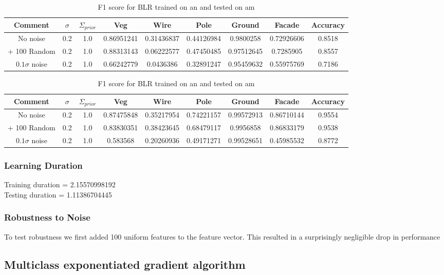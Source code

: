 \documentclass[10pt,a4paper]{article}
\begin{document}
\begin{table}[h]
\centering
\begin{tabular}{|c|c|c||c|c|c|c|c||c||}
\hline
Comment&$\sigma$&$\Sigma_{prior}$&Veg & Wire & Pole & Ground & Facade & Accuracy\\ \hline
No noise&0.2 & 1.0 & 0.86951241 & 0.31436837 & 0.44126984 & 0.9800258 &  0.72926606 & 0.8518\\ \hline
+ 100 Random & 0.2 & 1.0 & 0.88313143 & 0.06222577 & 0.47450485 & 0.97512645 & 0.7285905  & 0.8557\\ \hline
$0.1 \sigma$ noise & 0.2 & 1.0 & 0.66242779 & 0.0436386  & 0.32891247 & 0.95459632 & 0.55975769 & 0.7186 \\ \hline
\end{tabular}
\caption{F1 score for BLR trained on am and tested on an}
\vspace{10pt}
\begin{tabular}{||c|c|c||c|c|c|c|c||c||}
\hline
Comment&$\sigma$&$\Sigma_{prior}$&Veg & Wire & Pole & Ground & Facade & Accuracy\\ \hline
No noise & 0.2 & 1.0& 0.87475848 & 0.35217954  &0.74221157  &0.99572913  &0.86710144 & 0.9554\\ \hline
+ 100 Random & 0.2 & 1.0 & 0.83830351 & 0.38423645  &0.68479117  &0.9956858  &0.86833179 &0.9538 \\ \hline
$0.1 \sigma$ noise & 0.2 & 1.0 & 0.583568 & 0.20260936 & 0.49171271 & 0.99528651  &0.45985532 & 0.8772\\ \hline
\end{tabular}
\caption{F1 score for BLR trained on an and tested on am}
\end{table}
\subsubsection{Learning Duration}
Training duration =  2.15570998192\\
Testing duration =  1.11386704445
\subsubsection{Robustness to Noise}
To test robustness we first added 100 uniform features to the feature vector. This resulted in a surprisingly negligible drop in performance
\subsection{Multiclass exponentiated gradient algorithm}
\end{document}
